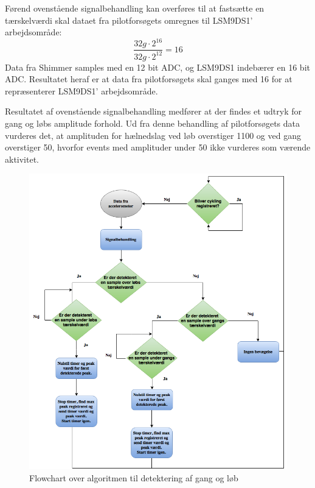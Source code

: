Førend ovenstående signalbehandling kan overføres til at fastsætte en tærskelværdi skal dataet fra pilotforsøgets omregnes til LSM9DS1' arbejdsområde: 
\begin{equation}
\frac{32 g \cdot 2^{16}}{32 g \cdot 2^{12}} = 16
\end{equation}
Data fra Shimmer samples med en 12 bit ADC, og LSM9DS1 indebærer en 16 bit ADC. Resultatet heraf er at data fra pilotforsøgets skal ganges med 16 for at repræsenterer LSM9DS1' arbejdsområde.

Resultatet af ovenstående signalbehandling medfører at der findes et udtryk for gang og løbs amplitude forhold. Ud fra denne behandling af pilotforsøgets data vurderes det, at amplituden for hælnedslag ved løb overstiger 1100 og ved gang overstiger 50, hvorfor events med amplituder under 50 ikke vurderes som værende aktivitet.

\begin{figure}[H]
	\centering
	\includegraphics[scale=0.5]{figures/cDesign/algoritme_gl.png}
	\caption{Flowchart over algoritmen til detektering af gang og løb}
	\label{fig:algoritme}
\end{figure}

